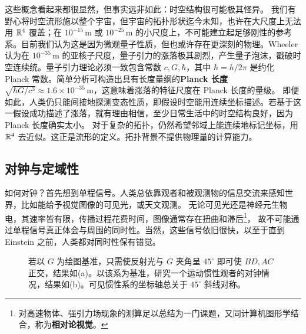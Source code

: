 这些概念看起来都很显然，但事实远非如此：时空结构很可能极其怪异。
我们有野心将时空流形施以整个宇宙，但宇宙的拓扑形状迄今未知，也许在大尺度上无法用 $\mathbb{R}^4$ 覆盖；在 $10^{-15}$\,m 或 $10^{-25}$\,m 的小尺度上，不可能建立起足够刚性的参考系。目前我们认为这是因为微观量子性质，但也或许存在更深刻的物理。Wheeler 认为在 $10^{-35}$\,m 的亚核子尺度，量子引力的涨落极其剧烈，产生量子泡沫，戳破时空连续统。量子引力理论必须一致包含常数 $c,G,\hbar$，其中 $\hbar=h/2\pi$ 是约化 Planck 常数。简单分析可构造出具有长度量纲的\textbf{Planck 长度} $\sqrt{\hbar G/c^3}\approx 1.6\times10^{-35}$\,m，这意味着涨落的特征尺度在 Planck 长度的量级。
即便如此，人类仍只能间接地探测变态性质，即假设时空能用连续坐标描述。若基于这一假设成功描述了涨落，就有理由相信，至少日常生活中的时空结构良好，因为 Planck 长度确实太小。
对于复杂的拓扑，仍然希望邻域上能连续地标记坐标，用 $\mathbb{R}^4$ 去近似。这正是流形的定义。拓扑背景不提供物理量的计算能力。

\subsection{对钟与定域性}

如何对钟？首先想到单程信号。人类总依靠观者和被观测物的信息交流来感知世界，比如能给予视觉图像的可见光，或天文观测。
无论可见光还是神经元生物电，其速率皆有限，传播过程花费时间，图像通常存在扭曲和滞后\footnote{对高速物体、强引力场现象的测算足以总结为一门课题，又同计算机图形学结合，称为\textbf{相对论视觉}。}，
故不可能通过单程信号真正体会与周围的同时性。当然，这些信号依旧很快，以至于直到 Einstein 之前，人类都对同时性保有错觉。

\begin{figure}[ht]
    \centering
    \qquad
    \caption{\small 若以 $G$ 为绘图基准，只需使反射光与 $G$ 夹角呈 $45^\circ$ 即可使 $BD,AC$ 正交，结果如(a)。以该系为基准，研究一个运动惯性观者的对钟情况，结果如(b)。可见惯性系的坐标轴总关于 $45^\circ$ 斜线对称。}
    \label{fig:clock_syn}
\end{figure}

